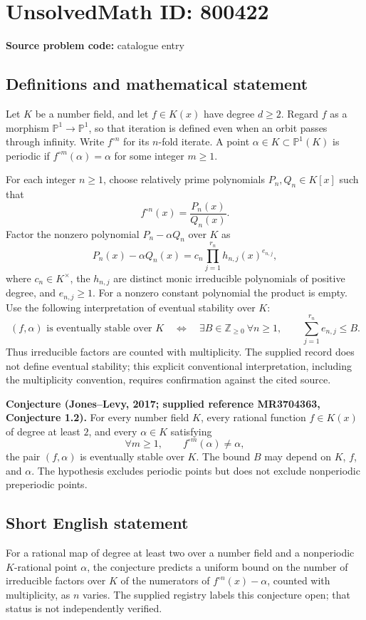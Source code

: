 \documentclass[11pt]{article}
\newcommand{\Z}{\mathbb{Z}}
\newcommand{\PP}{\mathbb{P}}
\begin{document}
\section*{UnsolvedMath ID: 800422}
\textbf{Source problem code:} catalogue entry
\subsection{Definitions and mathematical statement}
Let \(K\) be a number field, and let \(f\in K(x)\) have degree \(d\geq 2\). Regard \(f\) as a morphism \(\PP^1\to\PP^1\), so that iteration is defined even when an orbit passes through infinity. Write \(f^{\circ n}\) for its \(n\)-fold iterate. A point \(\alpha\in K\subset\PP^1(K)\) is periodic if \(f^{\circ m}(\alpha)=\alpha\) for some integer \(m\geq 1\).

For each integer \(n\geq 1\), choose relatively prime polynomials \(P_n,Q_n\in K[x]\) such that
\[
f^{\circ n}(x)=\frac{P_n(x)}{Q_n(x)}.
\]
Factor the nonzero polynomial \(P_n-\alpha Q_n\) over \(K\) as
\[
P_n(x)-\alpha Q_n(x)=c_n\prod_{j=1}^{r_n}h_{n,j}(x)^{e_{n,j}},
\]
where \(c_n\in K^\times\), the \(h_{n,j}\) are distinct monic irreducible polynomials of positive degree, and \(e_{n,j}\geq 1\). For a nonzero constant polynomial the product is empty. Use the following interpretation of eventual stability over \(K\):
\[
(f,\alpha)\text{ is eventually stable over }K
\quad\Longleftrightarrow\quad
\exists B\in\Z_{\geq 0}\ \forall n\geq 1,
\qquad \sum_{j=1}^{r_n}e_{n,j}\leq B.
\]
Thus irreducible factors are counted with multiplicity. The supplied record does not define eventual stability; this explicit conventional interpretation, including the multiplicity convention, requires confirmation against the cited source.

\textbf{Conjecture (Jones--Levy, 2017; supplied reference MR3704363, Conjecture 1.2).} For every number field \(K\), every rational function \(f\in K(x)\) of degree at least \(2\), and every \(\alpha\in K\) satisfying
\[
\forall m\geq 1,\qquad f^{\circ m}(\alpha)\neq\alpha,
\]
the pair \((f,\alpha)\) is eventually stable over \(K\). The bound \(B\) may depend on \(K\), \(f\), and \(\alpha\). The hypothesis excludes periodic points but does not exclude nonperiodic preperiodic points.
\subsection{Short English statement}
For a rational map of degree at least two over a number field and a nonperiodic \(K\)-rational point \(\alpha\), the conjecture predicts a uniform bound on the number of irreducible factors over \(K\) of the numerators of \(f^{\circ n}(x)-\alpha\), counted with multiplicity, as \(n\) varies. The supplied registry labels this conjecture open; that status is not independently verified.
\end{document}
